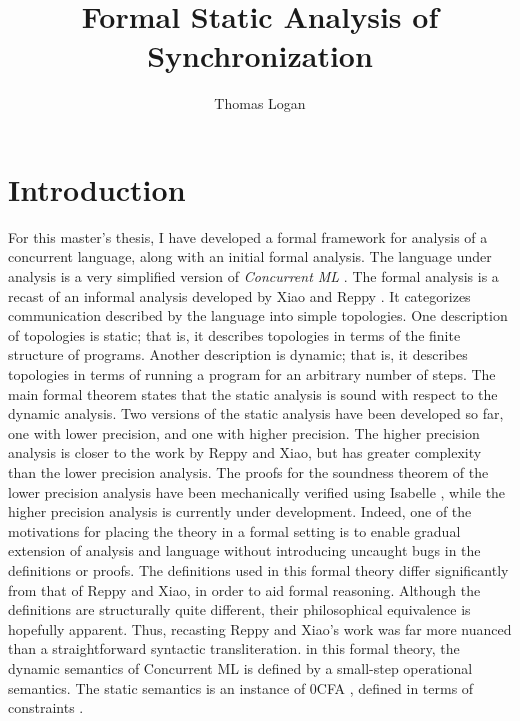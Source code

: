 \documentclass{article}
\title{Formal Static Analysis of Synchronization}
\author{Thomas Logan}
\begin{document}
\maketitle
{}

\newpage
{}


\section{Introduction}
For this master's thesis, I have developed a formal framework for analysis of
a concurrent language, along with an initial formal analysis.  The language under analysis is
a very simplified version of \textit{Concurrent ML} \cite{concurrent_ml}. The formal analysis
is a recast of an informal analysis developed by Xiao and Reppy \cite{specialization}. It
categorizes communication described by the language into simple topologies. One description of
topologies is static; that is, it describes topologies in terms of the finite structure of
programs.  Another description is dynamic; that is, it describes topologies in terms of running
a program for an arbitrary number of steps. The main formal theorem states that the static
analysis is sound with respect to the dynamic analysis. Two versions of the static analysis
have been developed so far, one with lower precision, and one with higher precision. The higher
precision analysis is closer to the work by Reppy and Xiao, but has greater complexity than the
lower precision analysis. The proofs for the soundness theorem of the lower precision analysis
have been mechanically verified using Isabelle \cite{isabelle}, while the higher precision
analysis is currently under development. Indeed, one of the motivations for placing the theory
in a formal setting is to enable gradual extension of analysis and language without introducing
uncaught bugs in the definitions or proofs. The definitions used in this formal theory differ
significantly from that of Reppy and Xiao, in order to aid formal reasoning. Although the
definitions are structurally quite different, their philosophical equivalence is hopefully
apparent. Thus, recasting Reppy and Xiao's work was far more nuanced than a straightforward
syntactic transliteration. in this formal theory, the dynamic semantics of Concurrent ML is
defined by a small-step operational semantics. The static semantics is an instance of 0CFA
\cite{0cfa}, defined in terms of constraints \cite{program_analysis}.
\end{document}
